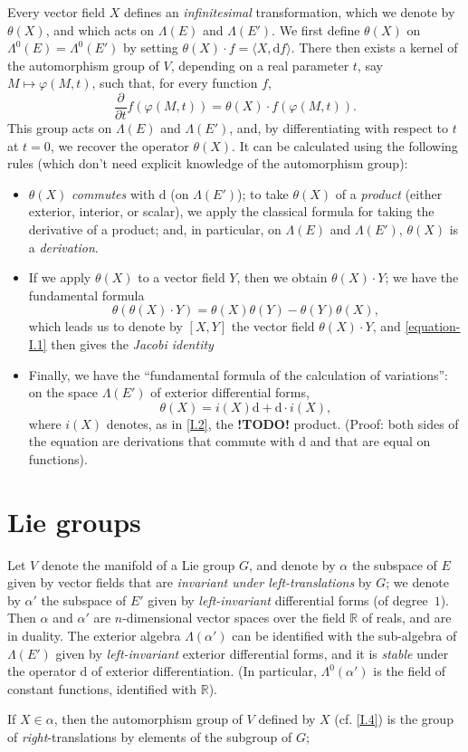 \documentclass{article}
\newcommand{\dd}{\mathrm{d}}
\newcommand{\RR}{\mathbb{R}}
\newcommand{\todo}{\textbf{ !TODO! }}
\newcommand{\oldpage}[1]{\marginpar{\footnotesize$\Big\vert$ \textit{p.~#1}}}
\begin{document}
Every vector field $X$ defines an \emph{infinitesimal} transformation, which we denote by $\theta(X)$, and which acts on $\Lambda(E)$ and $\Lambda(E')$.
We first define $\theta(X)$ on $\Lambda^0(E)=\Lambda^0(E')$ by setting $\theta(X)\cdot f=\langle X,\dd f\rangle$.
There then exists a kernel of the automorphism group of $V$, depending on a real parameter $t$, say $M\mapsto\varphi(M,t)$, such that, for every function $f$,
\[
  \frac{\partial}{\partial t} f(\varphi(M,t))
  = \theta(X)\cdot f(\varphi(M,t)).
\]
This group acts on $\Lambda(E)$ and $\Lambda(E')$, and, by differentiating with respect to $t$ at $t=0$, we recover the operator $\theta(X)$.
It can be calculated using the following rules (which don't need explicit knowledge of the automorphism group):
\begin{itemize}
  \item $\theta(X)$ \emph{commutes} with $\dd$ (on $\Lambda(E')$); to take $\theta(X)$ of a \emph{product} (either exterior, interior, or scalar), we apply the classical formula for taking the derivative of a product; and, in particular, on $\Lambda(E)$ and $\Lambda(E')$, $\theta(X)$ is a \emph{derivation}.
  \item If we apply $\theta(X)$ to a vector field $Y$, then we obtain $\theta(X)\cdot Y$; we have the fundamental formula
    \[
    \label{equation-I.1}
      \theta(\theta(X)\cdot Y) = \theta(X)\theta(Y) - \theta(Y)\theta(X),
    \tag{1}
    \]
    which leads us to denote by $[X,Y]$ the vector field $\theta(X)\cdot Y$, and \cref{equation-I.1} then gives the \emph{Jacobi identity}
\oldpage{10}
  \item Finally, we have the ``fundamental formula of the calculation of variations'':
    on the space $\Lambda(E')$ of exterior differential forms,
    \[
    \label{equation-I.2}
      \theta(X) = i(X)\dd + \dd\cdot i(X),
    \tag{2}
    \]
    where $i(X)$ denotes, as in \cref{I.2}, the \todo product.
    (Proof: both sides of the equation are derivations that commute with $\dd$ and that are equal on functions).
\end{itemize}


\section{Lie groups}
\label{I.5}

Let $V$ denote the manifold of a Lie group $G$, and denote by $\alpha$ the subspace of $E$ given by vector fields that are \emph{invariant under left-translations} by $G$;
we denote by $\alpha'$ the subspace of $E'$ given by \emph{left-invariant} differential forms (of degree~$1$).
Then $\alpha$ and $\alpha'$ are $n$-dimensional vector spaces over the field $\RR$ of reals, and are in duality.
The exterior algebra $\Lambda(\alpha')$ can be identified with the sub-algebra of $\Lambda(E')$ given by \emph{left-invariant} exterior differential forms, and it is \emph{stable} under the operator $\dd$ of exterior differentiation.
(In particular, $\Lambda^0(\alpha')$ is the field of constant functions, identified with $\RR$).

If $X\in\alpha$, then the automorphism group of $V$ defined by $X$ (cf. \cref{I.4}) is the group of \emph{right}-translations by elements of the subgroup of $G$;





\nocite{*}
\end{document}
